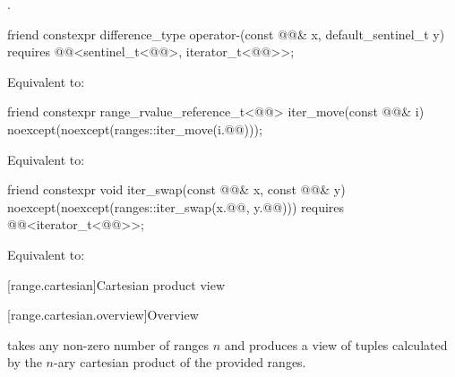 \begin{itemdescr}
\pnum
\returns
{}.
\end{itemdescr}

%
\begin{itemdecl}
friend constexpr difference_type operator-(const @@& x, default_sentinel_t y)
  requires @@<sentinel_t<@@>, iterator_t<@@>>;
\end{itemdecl}

\begin{itemdescr}
\pnum
\effects
Equivalent to: 
\end{itemdescr}

%
\begin{itemdecl}
friend constexpr range_rvalue_reference_t<@@> iter_move(const @@& i)
  noexcept(noexcept(ranges::iter_move(i.@@)));
\end{itemdecl}

\begin{itemdescr}
\pnum
\effects
Equivalent to: 
\end{itemdescr}

%
\begin{itemdecl}
friend constexpr void iter_swap(const @@& x, const @@& y)
  noexcept(noexcept(ranges::iter_swap(x.@@, y.@@)))
  requires @@<iterator_t<@@>>;
\end{itemdecl}

\begin{itemdescr}
\pnum
\effects
Equivalent to:
\end{itemdescr}

[range.cartesian]{Cartesian product view}

[range.cartesian.overview]{Overview}

%
\pnum
{} takes any non-zero number of ranges $n$ and
produces a view of tuples calculated by
the $n$-ary cartesian product of the provided ranges.

